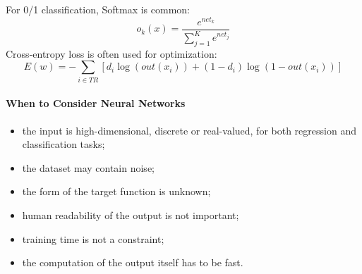 For 0/1 classification, Softmax is common:
\begin{equation*}
    o_k(x) = \dfrac{e^{net_k}}{\sum_{j=1}^K e^{net_j}}
\end{equation*}
Cross-entropy loss is often used for optimization:
\begin{equation*}
   E(w) = - \sum_{i \in TR} \left[ d_i \log (out(x_i)) + (1-d_i) \log(1-out(x_i)) \right]
\end{equation*}


\paragraph{When to Consider Neural Networks}
\begin{itemize}
    \item the input is high-dimensional, discrete or real-valued, for both regression and classification tasks;

    \item the dataset may contain noise;

    \item the form of the target function is unknown;

    \item human readability of the output is not important;

    \item training time is not a constraint;

    \item the computation of the output itself has to be fast.
\end{itemize}